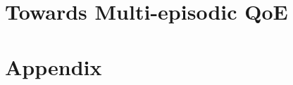 \documentclass[
		twoside,openright,titlepage,numbers=noenddot,headinclude,%
                footinclude=true,cleardoublepage=empty,
                BCOR=5mm,paper=a4,fontsize=11pt, %
                ngerman,american, %
                ]{scrreprt}
\begin{document}





\part{Towards Multi-episodic QoE}\cleardoublepage






\part{Appendix}\cleardoublepage
{} %
\setcounter{page}{1}



\cleardoublepage %



\end{document}
